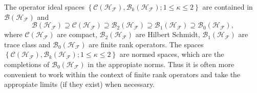 \documentclass[aps,preprint]{revtex4}%
\begin{document}
The operator ideal spaces $\left\{  \mathcal{C}\left(  \mathcal{H}%
_{\mathcal{F}}\right)  ,\mathcal{B}_{k}\left(  \mathcal{H}_{\mathcal{F}%
}\right)  ;1\leq\kappa\leq2\right\}  $ are contained in $\mathcal{B}\left(
\mathcal{H}_{\mathcal{F}}\right)  $ and
\begin{equation}
\mathcal{B}\left(  \mathcal{H}_{\mathcal{F}}\right)  \supseteq\mathcal{C}%
\left(  \mathcal{H}_{\mathcal{F}}\right)  \supseteq\mathcal{B}_{2}\left(
\mathcal{H}_{\mathcal{F}}\right)  \supseteq\mathcal{B}_{1}\left(
\mathcal{H}_{\mathcal{F}}\right)  \supseteq\mathcal{B}_{0}\left(
\mathcal{H}_{\mathcal{F}}\right)  ,
\end{equation}
where $\mathcal{C}\left(  \mathcal{H}_{\mathcal{F}}\right)  $ are compact,
$\mathcal{B}_{2}\left(  \mathcal{H}_{\mathcal{F}}\right)  $ are Hilbert
Schmidt, $\mathcal{B}_{1}\left(  \mathcal{H}_{\mathcal{F}}\right)  $ are trace
class and $\mathcal{B}_{0}\left(  \mathcal{H}_{\mathcal{F}}\right)  $ are
finite rank operators. The spaces $\left\{  \mathcal{C}\left(  \mathcal{H}%
_{\mathcal{F}}\right)  ,\mathcal{B}_{k}\left(  \mathcal{H}_{\mathcal{F}%
}\right)  ;1\leq\kappa\leq2\right\}  $ are normed spaces, which are the
completions of $\mathcal{B}_{0}\left(  \mathcal{H}_{\mathcal{F}}\right)  $ in
the appropiate norms. Thus it is often more convenient to work within the
context of finite rank operators and take the appropiate limits (if they
exist) when necessary.
\end{document}

